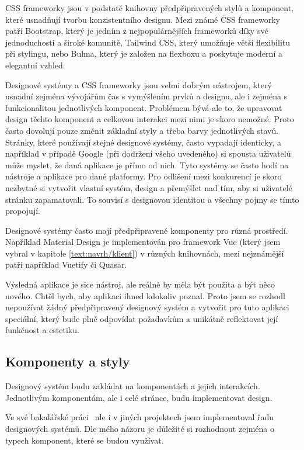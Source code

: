 CSS frameworky jsou v podstatě knihovny předpřipravených stylů a komponent, které usnadňují tvorbu konzistentního designu. 
Mezi známé CSS frameworky patří Bootstrap, který je jedním z nejpopulárnějších frameworků díky své jednoduchosti a široké komunitě, Tailwind CSS, který umožňuje větší flexibilitu při stylingu, nebo Bulma, který je založen na flexboxu a poskytuje moderní a elegantní vzhled.

Designové systémy a CSS frameworky jsou velmi dobrým nástrojem, který usnadní zejména vývojářům čas s vymýšlením prvků a designu, ale i zejména s funkcionalitou jednotlivých komponent. 
Problémem bývá ale to, že upravovat design těchto komponent a celkovou interakci mezi nimi je skoro nemožné. 
Proto často dovolují pouze změnit základní styly a třeba barvy jednotlivých stavů. 
Stránky, které používají stejné designové systémy, často vypadají identicky, a například v případě Google (při dodržení všeho uvedeného) si spousta uživatelů může myslet, že daná aplikace je přímo od nich. 
Tyto systémy se často hodí na nástroje a aplikace pro dané platformy.
Pro odlišení mezi konkurencí je skoro nezbytné si vytvořit vlastní systém, design a přemýšlet nad tím, aby si uživatelé stránku zapamatovali. 
To souvisí s designovou identitou a všechny pojmy se tímto propojují.

Designové systémy často mají předpřipravené komponenty pro různá prostředí. 
Například Material Design je implementován pro framework Vue (který jsem vybral v kapitole \ref{text:navrh/klient}) v různých knihovnách, mezi nejznámější patří například Vuetify či Quasar.

Výsledná aplikace je sice nástroj, ale reálně by měla být použita a být něco nového. 
Chtěl bych, aby aplikaci ihned kdokoliv poznal. 
Proto jsem se rozhodl nepoužívat žádný předpřipravený designový systém a vytvořit pro tuto aplikaci speciální, který bude plně odpovídat požadavkům a unikátně reflektovat její funkčnost a estetiku.

\subsection{Komponenty a styly}

Designový systém budu zakládat na komponentách a jejich interakcích.
Jednotlivým komponentám, ale i celé stránce, budu implementovat design.

Ve své bakalářské práci~\cite{cajthaml_bp} ale i v jiných projektech jsem implementoval řadu designových systémů.
Dle mého názoru je důležité si rozhodnout zejména o typech komponent, které se budou využívat.

